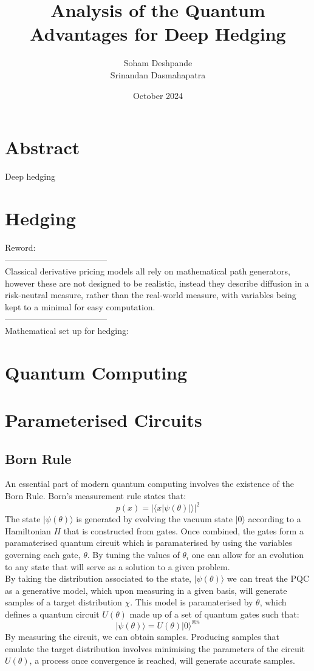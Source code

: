 \documentclass{article}
\title{Analysis of the Quantum Advantages for Deep Hedging}
\author{Soham Deshpande\\ Srinandan Dasmahapatra}
\date{October 2024}
\begin{document}
\maketitle

\tableofcontents

\clearpage

\section{Abstract}
Deep hedging

\clearpage
\section{Hedging}
Reword:\\ 
------------------------------------\\
Classical derivative pricing models all rely on mathematical path generators,
however these are not designed to be realistic, instead they describe diffusion
in a risk-neutral measure, rather than the real-world measure, with variables
being kept to a minimal for easy computation. 
\\------------------------------------\\

Mathematical set up for hedging:

\clearpage
\section{Quantum Computing}

\section{Parameterised Circuits}

\subsection{Born Rule}
An essential part of modern quantum computing involves the existence of the Born
Rule. Born's measurement rule states that:
$$p(x) = |\langle x|\psi(\theta)|\rangle|^2$$
The state $|\psi(\theta)\rangle$ is generated by evolving the vacuum state $|0\rangle$
according to a Hamiltonian $H$ that is constructed from gates. Once combined, the 
gates form a paramaterised quantum circuit which is paramaterised by using the 
variables governing each gate, $\theta$. By tuning the values of $\theta_i$ one 
can allow for an evolution to any state that will serve as a solution to a given 
problem. \\ 
By taking the distribution associated to the state, $|\psi(\theta)\rangle$ we can 
treat the PQC as a generative model, which upon measuring in a given basis, will 
generate samples of a target distribution $\chi$. This model is paramaterised 
by $\theta$, which defines a quantum circuit $U(\theta)$ made up of a set of quantum 
gates such that:
$$|\psi(\theta)\rangle = U(\theta)|0\rangle^{\otimes n}$$
By measuring the circuit, we can obtain samples. Producing samples that emulate 
the target distribution involves minimising the parameters of the circuit $U(\theta)$, 
a process once convergence is reached, will generate accurate samples. 
\cite{bornmachine} 
\end{document}
